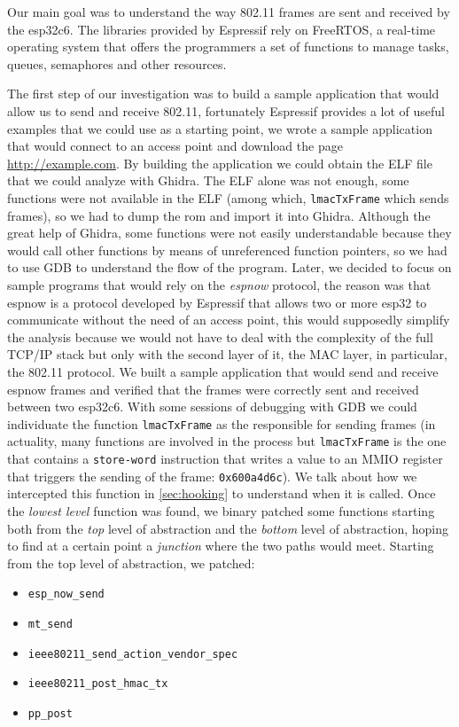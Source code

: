Our main goal was to understand the way 802.11 frames are sent
and received by the esp32c6.
The libraries provided by Espressif rely on FreeRTOS,
a real-time operating system that offers the programmers a
set of functions to manage tasks, queues, semaphores and other 
resources.

The first step of our investigation was to
build a sample application that would allow us to send and
receive 802.11, fortunately Espressif provides a lot of
useful examples that we could use as a starting point,
we wrote a sample application that would connect to an
access point and download the page \url{http://example.com}.
By building the application we could obtain the ELF file
that we could analyze with Ghidra.
The ELF alone was not enough, some functions were not
available in the ELF (among which, \texttt{lmacTxFrame} which 
sends frames), so we had to dump the rom and import
it into Ghidra.
Although the great help of Ghidra, some functions were
not easily understandable because they would call other 
functions by means of unreferenced function pointers,
so we had to use GDB to understand the flow of the program.
Later, we decided to focus on sample programs that would
rely on the \textit{espnow} protocol, the reason was that
espnow is a protocol developed by Espressif that allows
two or more esp32 to communicate without the need of an
access point, this would supposedly simplify the analysis
because we would not have to deal with the complexity of
the full TCP/IP stack but only with the second layer of it,
the MAC layer, in particular, the 802.11 protocol.
We built a sample application that would send and receive 
espnow frames and verified that the frames were correctly
sent and received between two esp32c6.
With some sessions of debugging with GDB we could individuate
the function \texttt{lmacTxFrame} as the responsible for sending
frames (in actuality, many functions are involved in the process
but \texttt{lmacTxFrame} is the one that contains a
\texttt{store-word} instruction that writes a value to an
MMIO register that triggers the sending of the frame: \texttt{0x600a4d6c}).
We talk about how we intercepted this function in \ref{sec:hooking} to understand
when it is called.
Once the \textit{lowest level} function was found, we binary patched some functions
starting both from the \textit{top} level of abstraction and
the \textit{bottom} level of abstraction, hoping to find 
at a certain point a \textit{junction} where the two paths would meet.
Starting from the top level of abstraction, we patched:
\begin{itemize}
\item \texttt{esp\_now\_send}
\item \texttt{mt\_send}
\item \texttt{ieee80211\_send\_action\_vendor\_spec}
\item \texttt{ieee80211\_post\_hmac\_tx}
\item \texttt{pp\_post}
\end{itemize}
